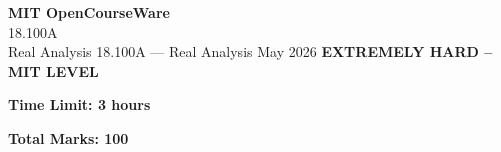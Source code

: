 \documentclass[12pt,a4paper]{exam}
\begin{document}
\begin{center}
{\LARGE \textbf{MIT OpenCourseWare}}\\18.100A\\Real Analysis
\vspace{0.5cm}
{18.100A} --- {Real Analysis}
\vspace{0.3cm}
May 2026
\vspace{0.3cm}
\textbf{EXTREMELY HARD -- MIT LEVEL}
\end{center}

\begin{center}
\textbf{Time Limit: 3 hours}
\end{center}

\begin{center}
\textbf{Total Marks: 100}
\end{center}

\vspace{0.5cm}
\end{document}
